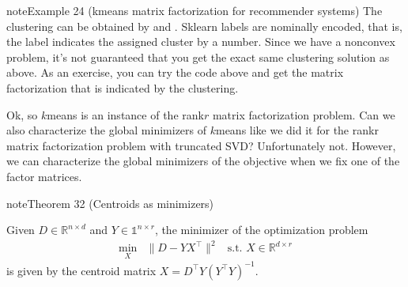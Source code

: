 \documentclass[letterpaper,10pt,english]{jupyterBook}
\begin{document}
\begin{sphinxadmonition}{note}{Example 24 (k\sphinxhyphen{}means matrix factorization for recommender systems)}
\sphinxAtStartPar
The clustering can be obtained by  and . Sklearn labels are nominally encoded, that is, the label indicates the assigned cluster by a number. Since we have a nonconvex problem, it’s not guaranteed that you get the exact same clustering solution as above. As an exercise, you can try the code above and get the matrix factorization that is indicated by the clustering.
\end{sphinxadmonition}

\sphinxAtStartPar
Ok, so \(k\)\sphinxhyphen{}means is an instance of the rank\sphinxhyphen{}\(r\) matrix factorization problem. Can we also characterize the global minimizers of \(k\)\sphinxhyphen{}means like we did it for the rank\sphinxhyphen{}r matrix factorization problem with truncated SVD? Unfortunately not. However, we can characterize the global minimizers of the objective when we fix one of the factor matrices.
\label{clustering_k_means_mf:theorem-2}
\begin{sphinxadmonition}{note}{Theorem 32 (Centroids as minimizers)}



\sphinxAtStartPar
Given \(D\in\mathbb{R}^{n\times d}\) and \(Y\in\mathbb{1}^{n\times r}\), the minimizer of the optimization problem
\label{equation:clustering_k_means_mf:c7f6e33d-61a2-467e-ac74-507942abf02c}\begin{align}
    \min_X& \lVert D-YX^\top \rVert^2 & \text{s.t. } X\in\mathbb{R}^{d\times r}\label{eq:minX}
\end{align}
\sphinxAtStartPar
is given by the centroid matrix \(X=D^\top Y(Y^\top Y)^{-1}\).
\end{sphinxadmonition}
\end{document}
